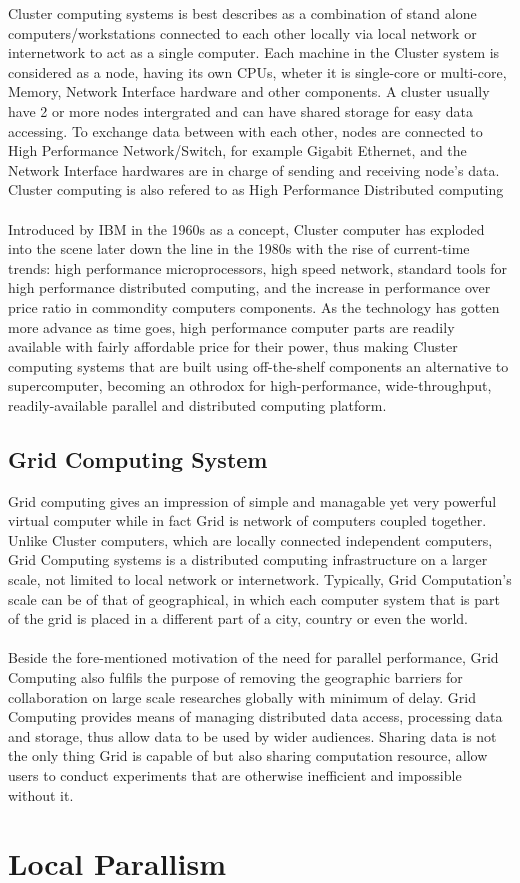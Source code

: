 Cluster computing systems is best describes as a combination of stand alone computers/workstations connected to each other locally via local network or internetwork to act as a single computer. Each machine in the Cluster system is considered as a node, having its own CPUs, wheter it is single-core or multi-core, Memory, Network Interface hardware and other components. A cluster usually have 2 or more nodes intergrated and can have shared storage for easy data accessing. To exchange data between with each other, nodes are connected to High Performance Network/Switch, for example Gigabit Ethernet, and the Network Interface hardwares are in charge of sending and receiving node's data. Cluster computing is also refered to as High Performance Distributed computing\\
~\\
Introduced by IBM in the 1960s as a concept, Cluster computer has exploded into the scene later down the line in the 1980s with the rise of current-time trends: high performance microprocessors, high speed network, standard tools for high performance distributed computing, and the increase in performance over price ratio in commondity computers components. As the technology has gotten more advance as time goes, high performance computer parts are readily available with fairly affordable price for their power, thus making Cluster computing systems that are built using off-the-shelf components an alternative to supercomputer, becoming an othrodox for high-performance, wide-throughput, readily-available parallel and distributed computing platform. \\

\subsection{Grid Computing System}

Grid computing gives an impression of simple and managable yet very powerful virtual computer while in fact Grid is network of computers coupled together. Unlike Cluster computers, which are locally connected independent computers, Grid Computing systems is a distributed computing infrastructure on a larger scale, not limited to local network or internetwork. Typically, Grid Computation's scale can be of that of geographical, in which each computer system that is part of the grid is placed in a different part of a city, country or even the world. \\
~\\
Beside the fore-mentioned motivation of the need for parallel performance, Grid Computing also fulfils the purpose of removing the geographic barriers for collaboration on large scale researches globally with minimum of delay. Grid Computing provides means of managing distributed data access, processing data and storage, thus allow data to be used by wider audiences. Sharing data is not the only thing Grid is capable of but also sharing computation resource, allow users to conduct experiments that are otherwise inefficient and impossible without it. \\


\section{Local Parallism}

